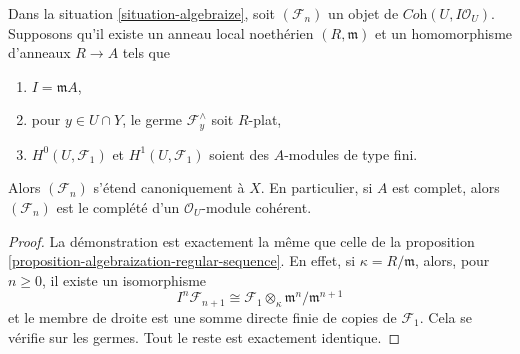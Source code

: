 \begin{proposition}
\label{proposition-algebraization-flat}
Dans la situation \ref{situation-algebraize}, soit
$(\mathcal{F}_n)$ un objet de $\textit{Coh}(U, I\mathcal{O}_U)$.
Supposons qu'il existe un anneau local noethérien $(R, \mathfrak m)$ et un homomorphisme
d'anneaux $R \to A$ tels que
\begin{enumerate}
\item $I = \mathfrak m A$,
\item pour $y \in U \cap Y$, le germe $\mathcal{F}_y^\wedge$ soit $R$-plat,
\item $H^0(U, \mathcal{F}_1)$ et $H^1(U, \mathcal{F}_1)$ soient des
$A$-modules de type fini.
\end{enumerate}
Alors $(\mathcal{F}_n)$ s'étend canoniquement à $X$. En particulier, si $A$
est complet, alors $(\mathcal{F}_n)$ est le complété d'un
$\mathcal{O}_U$-module cohérent.
\end{proposition}

\begin{proof}
La démonstration est exactement la même que celle de la
proposition \ref{proposition-algebraization-regular-sequence}.
En effet, si $\kappa = R/\mathfrak m$, alors, pour $n \geq 0$,
il existe un isomorphisme
$$
I^n \mathcal{F}_{n + 1} \cong
\mathcal{F}_1 \otimes_\kappa \mathfrak m^n/\mathfrak m^{n + 1}
$$
et le membre de droite est une somme directe finie de copies
de $\mathcal{F}_1$. Cela se vérifie sur les germes.
Tout le reste est exactement identique.
\end{proof}

